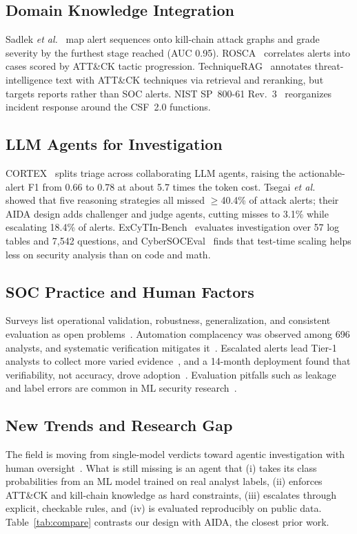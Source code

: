 \documentclass[conference]{IEEEtran}
\begin{document}
\subsection{Domain Knowledge Integration}
Sadlek \emph{et al.}~\cite{sadlek2025} map alert sequences onto
kill-chain attack graphs and grade severity by the furthest stage
reached (AUC 0.95). ROSCA~\cite{garcia2025rosca} correlates alerts into
cases scored by ATT\&CK tactic progression. TechniqueRAG~\cite{lekssays2025}
annotates threat-intelligence text with ATT\&CK techniques via
retrieval and reranking, but targets reports rather than SOC alerts.
NIST SP~800-61 Rev.~3~\cite{nist80061r3} reorganizes incident response
around the CSF~2.0 functions.

\subsection{LLM Agents for Investigation}
CORTEX~\cite{wei2025cortex} splits triage across collaborating LLM
agents, raising the actionable-alert F1 from 0.66 to 0.78 at about 5.7
times the token cost. Tsegai \emph{et al.}~\cite{tsegai2026} showed that
five reasoning strategies all missed $\geq$40.4\% of attack alerts;
their AIDA design adds challenger and judge agents, cutting misses to
3.1\% while escalating 18.4\% of alerts. ExCyTIn-Bench~\cite{wu2025excytin}
evaluates investigation over 57 log tables and 7{,}542 questions, and
CyberSOCEval~\cite{deason2025} finds that test-time scaling helps less
on security analysis than on code and math.

\subsection{SOC Practice and Human Factors}
Surveys list operational validation, robustness, generalization, and
consistent evaluation as open problems~\cite{ndichu2026,habibzadeh2025}.
Automation complacency was observed among 696 analysts, and systematic
verification mitigates it~\cite{tilbury2026}. Escalated alerts lead
Tier-1 analysts to collect more varied evidence~\cite{kersten2025}, and
a 14-month deployment found that verifiability, not accuracy, drove
adoption~\cite{banstola2026}. Evaluation pitfalls such as leakage and
label errors are common in ML security
research~\cite{arp2022,engelen2021}.

\subsection{New Trends and Research Gap}
The field is moving from single-model verdicts toward agentic
investigation with human oversight~\cite{tsegai2026,banstola2026}.
What is still missing is an agent that (i) takes its class
probabilities from an ML model trained on real analyst labels,
(ii) enforces ATT\&CK and kill-chain knowledge as hard constraints,
(iii) escalates through explicit, checkable rules, and (iv) is
evaluated reproducibly on public data. Table~\ref{tab:compare} contrasts
our design with AIDA, the closest prior work.
\end{document}
